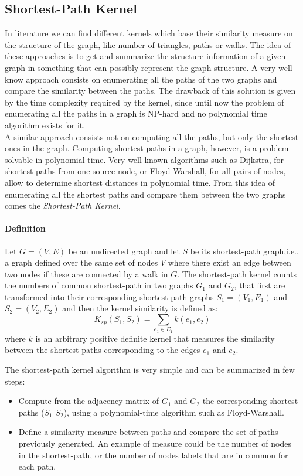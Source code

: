 \documentclass[11pt,a4paper]{article}
\begin{document}
\subsection{Shortest-Path Kernel}
In literature we can find different kernels which base their similarity measure on the structure of the graph, like number of triangles, paths or walks. The idea of these approaches is to get and summarize the structure information of a given graph in something that can possibly represent the graph structure.
A very well know approach consists on enumerating all the paths of the two graphs and compare the similarity between the paths. The drawback of this solution is given by the time complexity required by the kernel, since until now the problem of enumerating all the paths in a graph is NP-hard and no polynomial time algorithm exists for it. \\
A similar approach consists not on computing all the paths, but only the shortest ones in the graph. Computing shortest paths in a graph, however, is a problem
solvable in polynomial time. Very well known algorithms such as Dijkstra, for shortest paths from one source node, or Floyd-Warshall, for all pairs of nodes, allow to determine shortest distances in polynomial time. From this idea of enumerating all the shortest paths and compare them between the two graphs comes the \textit{Shortest-Path Kernel}.


\paragraph{Definition} Let $G = (V,E)$ be an undirected graph and let $S$ be its shortest-path graph,i.e., a graph defined over the same set of nodes $V$ where there exist an edge between two nodes if these are connected by a walk in $G$. The shortest-path kernel counts the numbers of common shortest-path in two graphs $G_1$ and $G_2$, that first are transformed into their corresponding shortest-path graphs $S_1 = (V_1, E_1)$ and $S_2 = (V_2, E_2)$ and then the kernel similarity is defined as:
$$K_{sp}(S_1,S_2) = \sum_{e_1\in E_1} k(e_1, e_2)$$
where $k$ is an arbitrary positive definite kernel that measures the similarity between the shortest paths corresponding to the edges $e_1$ and $e_2$.\\
\newpage

The shortest-path kernel algorithm is very simple and can be summarized in few steps:
\begin{itemize}
	\item Compute from the adjacency matrix of $G_1$ and $G_2$ the corresponding shortest paths ($S_1$ $S_2$), using a polynomial-time algorithm such as Floyd-Warshall.
	\item Define a similarity measure between paths and compare the set of paths previously generated. An example of measure could be the number of nodes in the shortest-path, or the number of nodes labels that are in common for each path.
\end{itemize} 
\end{document}
